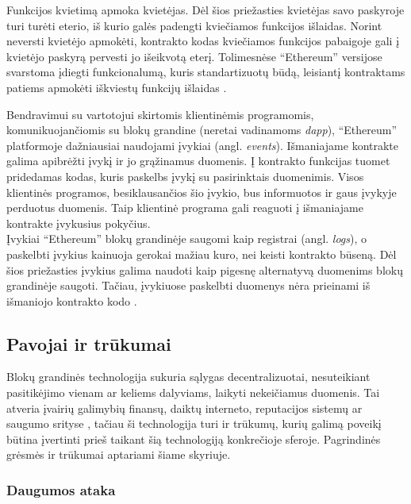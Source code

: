 Funkcijos kvietimą apmoka kvietėjas. Dėl šios priežasties kvietėjas savo paskyroje turi turėti eterio, iš kurio galės padengti
kviečiamos funkcijos išlaidas. Norint neversti kvietėjo apmokėti, kontrakto kodas kviečiamos funkcijos pabaigoje gali į kvietėjo paskyrą
pervesti jo išeikvotą eterį. Tolimesnėse \enquote{Ethereum} versijose svarstoma įdiegti funkcionalumą,
kuris standartizuotų būdą, leisiantį kontraktams patiems apmokėti iškviestų funkcijų išlaidas \cite{ContractPays}.

Bendravimui su vartotojui skirtomis klientinėmis programomis, komunikuojančiomis su blokų grandine (neretai vadinamoms \textit{dapp}), \enquote{Ethereum} platformoje dažniausiai naudojami
įvykiai (angl. \textit{events}). Išmaniajame kontrakte galima apibrėžti įvykį ir jo grąžinamus duomenis. Į kontrakto funkcijas tuomet
pridedamas kodas, kuris paskelbs įvykį su pasirinktais duomenimis. Visos klientinės programos,
besiklausančios šio įvykio, bus informuotos ir gaus įvykyje perduotus duomenis. Taip klientinė programa gali reaguoti į išmaniajame
kontrakte įvykusius pokyčius.\\
Įvykiai \enquote{Ethereum} blokų grandinėje saugomi kaip registrai (angl. \textit{logs}), o paskelbti įvykius kainuoja gerokai mažiau kuro,
nei keisti kontrakto būseną. Dėl šios priežasties įvykius galima naudoti kaip pigesnę alternatyvą duomenims blokų grandinėje saugoti. Tačiau, įvykiuose paskelbti
duomenys nėra prieinami iš išmaniojo kontrakto kodo \cite{EthereumWhitePaper}.

\subsection{Pavojai ir trūkumai} \label{blockchain:concerns}

Blokų grandinės technologija sukuria sąlygas decentralizuotai, nesuteikiant pasitikėjimo vienam ar keliems dalyviams, laikyti nekeičiamus duomenis.
Tai atveria įvairių galimybių finansų, daiktų interneto, reputacijos sistemų ar saugumo srityse \cite{Zheng2017}, tačiau ši technologija turi ir trūkumų,
kurių galimą poveikį būtina įvertinti prieš taikant šią technologiją konkrečioje sferoje. Pagrindinės grėsmės ir trūkumai aptariami šiame skyriuje.

\subsubsection{Daugumos ataka}

